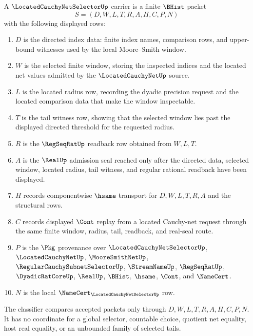 \begin{definition}
\label{def:located-cauchy-net-selector-carrier}
A $\LocatedCauchyNetSelectorUp$ carrier is a finite $\BHist$ packet
$$
S=(D,W,L,T,R,A,H,C,P,N)
$$
with the following displayed rows:
\begin{enumerate}
\item $D$ is the directed index data: finite index names, comparison rows, and upper-bound witnesses used by the local Moore--Smith window.
\item $W$ is the selected finite window, storing the inspected indices and the located net values admitted by the $\LocatedCauchyNetUp$ source.
\item $L$ is the located radius row, recording the dyadic precision request and the located comparison data that make the window inspectable.
\item $T$ is the tail witness row, showing that the selected window lies past the displayed directed threshold for the requested radius.
\item $R$ is the $\RegSeqRatUp$ readback row obtained from $W,L,T$.
\item $A$ is the $\RealUp$ admission seal reached only after the directed data, selected window, located radius, tail witness, and regular rational readback have been displayed.
\item $H$ records componentwise $\hsame$ transport for $D,W,L,T,R,A$ and the structural rows.
\item $C$ records displayed $\Cont$ replay from a located Cauchy-net request through the same finite window, radius, tail, readback, and real-seal route.
\item $P$ is the $\Pkg$ provenance over $\LocatedCauchyNetSelectorUp$, $\LocatedCauchyNetUp$, $\MooreSmithNetUp$, $\RegularCauchySubnetSelectorUp$, $\StreamNameUp$, $\RegSeqRatUp$, $\DyadicRatCoreUp$, $\RealUp$, $\BHist$, $\hsame$, $\Cont$, and $\NameCert$.
\item $N$ is the local $\NameCert_{\LocatedCauchyNetSelectorUp}$ row.
\end{enumerate}
The classifier compares accepted packets only through $D,W,L,T,R,A,H,C,P,N$. It has no coordinate for a global selector, countable choice, quotient net equality, host real equality, or an unbounded family of selected tails.
\end{definition}

